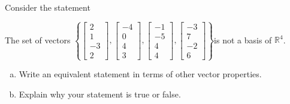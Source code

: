 
\begin{exerciseStatement}


Consider the statement 
\begin{center}\begin{minipage}{0.8\textwidth}
 The set of vectors \( \left\{ \left[\begin{array}{c}
2 \\
1 \\
-3 \\
2
\end{array}\right] , \left[\begin{array}{c}
-4 \\
0 \\
4 \\
3
\end{array}\right] , \left[\begin{array}{c}
-1 \\
-5 \\
4 \\
4
\end{array}\right] , \left[\begin{array}{c}
-3 \\
7 \\
-2 \\
6
\end{array}\right] \right\} \)is not a basis of \(\mathbb{R}^4\). 
\end{minipage}\end{center}
    


\begin{enumerate}[(a)]
\item  Write an equivalent statement in terms of other vector properties.
\item  Explain why your statement is true or false.
\end{enumerate}
    
\end{exerciseStatement}
    
